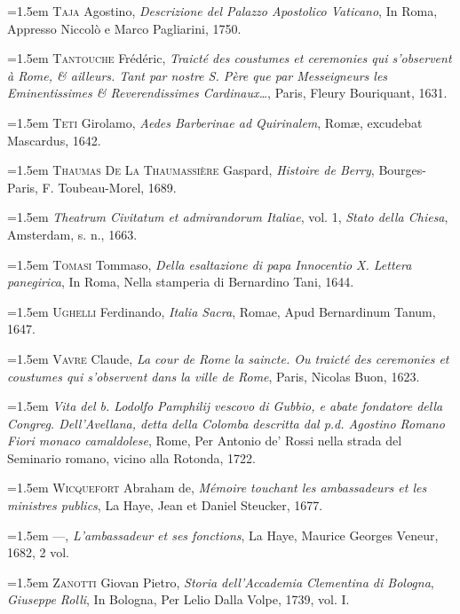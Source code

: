 \documentclass[12pt,twoside,openany]{book}
\newenvironment{PurhBibliography}
  {%
    \par
    \setlength{\parindent}{0pt}%
    \setlength{\leftskip}{0pt}%
  }
  {%
    \par
  }
\begin{document}
\begin{PurhBibliography}
\noindent\hangindent=1.5em \textsc{Taja} Agostino, \textit{Descrizione del Palazzo Apostolico Vaticano}, In Roma, Appresso Niccolò e Marco Pagliarini, 1750.\par
\noindent\hangindent=1.5em \textsc{Tantouche} Frédéric, \textit{Traicté des coustumes et ceremonies qui s’observent à Rome, \& ailleurs. Tant par nostre S. Père que par Messeigneurs les Eminentissimes \& Reverendissimes Cardinaux…}, Paris, Fleury Bouriquant, 1631.\par
\noindent\hangindent=1.5em \textsc{Teti} Girolamo, \textit{Aedes Barberinae ad Quirinalem}, Romæ, excudebat Mascardus, 1642.\par
\noindent\hangindent=1.5em \textsc{Thaumas De La Thaumassière} Gaspard, \textit{Histoire de Berry}, Bourges-Paris, F. Toubeau-Morel, 1689.\par
\noindent\hangindent=1.5em \textit{Theatrum Civitatum et admirandorum Italiae}, vol. 1, \textit{Stato della Chiesa}, Amsterdam, s. n., 1663.\par
\noindent\hangindent=1.5em \textsc{Tomasi} Tommaso, \textit{Della esaltazione di papa Innocentio X. Lettera panegirica}, In Roma, Nella stamperia di Bernardino Tani, 1644.\par
\noindent\hangindent=1.5em \textsc{Ughelli} Ferdinando, \textit{Italia Sacra}, Romae, Apud Bernardinum Tanum, 1647.\par
\noindent\hangindent=1.5em \textsc{Vavre} Claude, \textit{La cour de Rome la saincte. Ou traicté des ceremonies et coustumes qui s’observent dans la ville de Rome}, Paris, Nicolas Buon, 1623.\par
\noindent\hangindent=1.5em \textit{Vita del b. Lodolfo Pamphilij vescovo di Gubbio, e abate fondatore della Congreg. Dell’Avellana, detta della Colomba descritta dal p.d. Agostino Romano Fiori monaco camaldolese}, Rome, Per Antonio de’ Rossi nella strada del Seminario romano, vicino alla Rotonda, 1722.\par
\noindent\hangindent=1.5em \textsc{Wicquefort} Abraham de, \textit{Mémoire touchant les ambassadeurs et les ministres publics}, La Haye, Jean et Daniel Steucker, 1677.\par
\noindent\hangindent=1.5em —, \textit{L’ambassadeur et ses fonctions}, La Haye, Maurice Georges Veneur, 1682, 2 vol.\par
\noindent\hangindent=1.5em \textsc{Zanotti} Giovan Pietro, \textit{Storia dell’Accademia Clementina di Bologna}, \textit{Giuseppe Rolli}, In Bologna, Per Lelio Dalla Volpe, 1739, vol. I.\par
\end{PurhBibliography}
\end{document}
